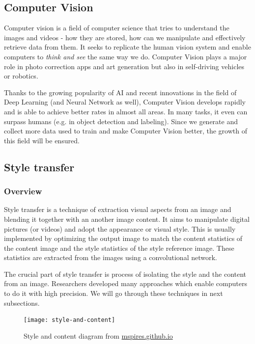 \documentclass[../Main.tex]{subfiles}
\begin{document}
\subsection{Computer Vision}
    Computer vision is a field of computer science that tries to understand the images and videos - how they are stored, how can we manipulate and effectively retrieve data from them. It seeks to replicate the human vision system and enable computers to \textit{think and see} the same way we do. Computer Vision plays a major role in photo correction apps and art generation but also in self-driving vehicles or robotics.
    
    Thanks to the growing popularity of AI and recent innovations in the field of Deep Learning (and Neural Network as well), Computer Vision develops rapidly and is able to achieve better rates in almost all areas. In many tasks, it even can surpass humans (e.g. in object detection and labeling). Since we generate and collect more data used to train and make Computer Vision better, the growth of this field will be ensured. 

\subsection{Style transfer}
    \subsubsection{Overview}
    Style transfer is a technique of extraction visual aspects from an image and blending it together with an another image content. It aims to manipulate digital pictures (or videos) and adopt the appearance or visual style. This is usually implemented by optimizing the output image to match the content statistics of the content image and the style statistics of the style reference image. These statistics are extracted from the images using a convolutional network. 
    
    The crucial part of style transfer is process of isolating the style and the content from an image. Researchers developed many approaches which enable computers to do it with high precision. We will go through these techniques in next subsections.  \\
    \begin{figure}[h]
        \centering
        \texttt{[image: style-and-content]}
        \caption{Style and content diagram from \href{https://mspries.github.io/OpticalIllusionReportPage.html}{mspires.github.io}}
        \label{fig:style-and-content}
    \end{figure}
    
\end{document}
